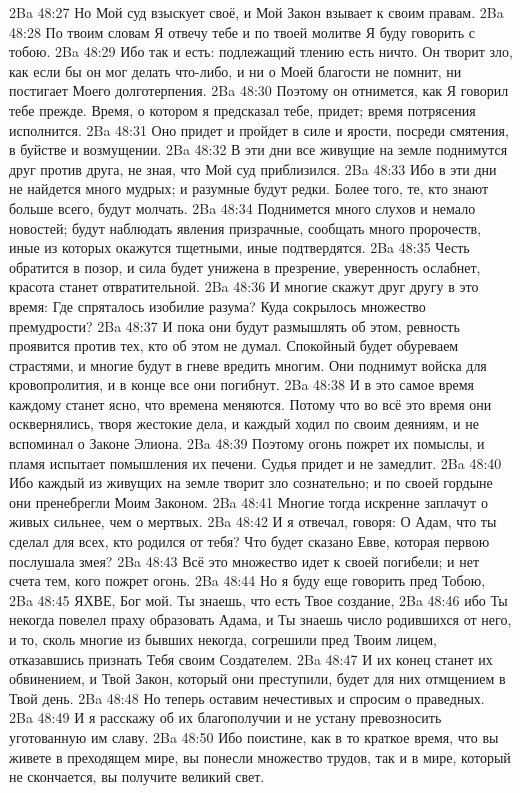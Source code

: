 \vs 2Ba 48:27
Но Мой суд взыскует своё, и Мой Закон взывает к своим правам.
\vs 2Ba 48:28
По твоим словам Я отвечу тебе и по твоей молитве Я буду говорить с тобою.
\vs 2Ba 48:29
Ибо так и есть: подлежащий тлению есть ничто. Он творит зло, как если бы он мог делать что-либо, и ни о Моей благости не помнит, ни постигает Моего долготерпения.
\vs 2Ba 48:30
Поэтому он отнимется, как Я говорил тебе прежде. Время, о котором я предсказал тебе, придет; время потрясения исполнится.
\vs 2Ba 48:31
Оно придет и пройдет в силе и ярости, посреди смятения, в буйстве и возмущении.
\vs 2Ba 48:32
В эти дни все живущие на земле поднимутся друг против друга, не зная, что Мой суд приблизился.
\vs 2Ba 48:33
Ибо в эти дни не найдется много мудрых; и разумные будут редки. Более того, те, кто знают больше всего, будут молчать.
\vs 2Ba 48:34
Поднимется много слухов и немало новостей; будут наблюдать явления призрачные, сообщать много пророчеств, иные из которых окажутся тщетными, иные подтвердятся.
\vs 2Ba 48:35
Честь обратится в позор, и сила будет унижена в презрение, уверенность ослабнет, красота станет отвратительной.
\vs 2Ba 48:36
И многие скажут друг другу в это время: Где спряталось изобилие разума? Куда сокрылось множество премудрости?
\vs 2Ba 48:37
И пока они будут размышлять об этом, ревность проявится против тех, кто об этом не думал. Спокойный будет обуреваем страстями, и многие будут в гневе вредить многим. Они поднимут войска для кровопролития, и в конце все они погибнут.
\vs 2Ba 48:38
И в это самое время каждому станет ясно, что времена меняются. Потому что во всё это время они осквернялись, творя жестокие дела, и каждый ходил по своим деяниям, и не вспоминал о Законе Элиона.
\vs 2Ba 48:39
Поэтому огонь пожрет их помыслы, и пламя испытает помышления их печени. Судья придет и не замедлит.
\vs 2Ba 48:40
Ибо каждый из живущих на земле творит зло сознательно; и по своей гордыне они пренебрегли Моим Законом.
\vs 2Ba 48:41
Многие тогда искренне заплачут о живых сильнее, чем о мертвых.
\vs 2Ba 48:42
И я отвечал, говоря: О Адам, что ты сделал для всех, кто родился от тебя? Что будет сказано Евве, которая первою послушала змея?
\vs 2Ba 48:43
Всё это множество идет к своей погибели; и нет счета тем, кого пожрет огонь.
\vs 2Ba 48:44
Но я буду еще говорить пред Тобою,
\vs 2Ba 48:45
ЯХВЕ, Бог мой. Ты знаешь, что есть Твое создание,
\vs 2Ba 48:46
ибо Ты некогда повелел праху образовать Адама, и Ты знаешь число родившихся от него, и то, сколь многие из бывших некогда, согрешили пред Твоим лицем, отказавшись признать Тебя своим Создателем.
\vs 2Ba 48:47
И их конец станет их обвинением, и Твой Закон, который они преступили, будет для них отмщением в Твой день.
\vs 2Ba 48:48
Но теперь оставим нечестивых и спросим о праведных.
\vs 2Ba 48:49
И я расскажу об их благополучии и не устану превозносить уготованную им славу.
\vs 2Ba 48:50
Ибо поистине, как в то краткое время, что вы живете в преходящем мире, вы понесли множество трудов, так и в мире, который не скончается, вы получите великий свет.

